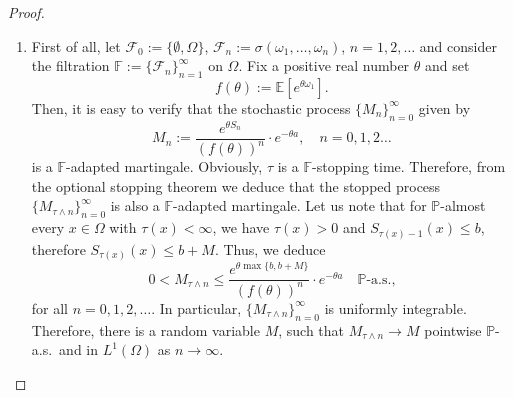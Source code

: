 \documentclass[10pt,a4paper]{amsart}
\newcommand{\cF}{\mathcal{F}}
\begin{document}
\begin{proof}
\begin{enumerate}
    \item First of all, let $\cF_0:=\{\emptyset,\Omega\}$, $\cF_n:=\sigma(\omega_1,\ldots,\omega_n)$, $n=1,2,\ldots$ and consider the filtration $\mathbb{F}:=\{\mathcal{F}_n\}^{\infty}_{n=1}$ on $\Omega$. Fix a positive real number $\theta$ and set
	\begin{equation*}
		f(\theta):=\mathbb{E}[e^{\theta\omega_1}].
	\end{equation*}
	Then, it is easy to verify that the stochastic process $\{M_n\}^{\infty}_{n=0}$ given by
	\begin{equation*}
		M_n:=\frac{e^{\theta S_n}}{(f(\theta))^n}\cdot e^{-\theta a},\quad n=0,1,2\ldots
	\end{equation*}
	is a $\mathbb{F}$-adapted martingale. Obviously, $\tau$ is a $\mathbb{F}$-stopping time. Therefore, from the optional stopping theorem we deduce that the stopped process $\{M_{\tau\wedge n}\}^{\infty}_{n=0}$ is also a $\mathbb{F}$-adapted martingale. Let us note that for $\mathbb{P}$-almost every $x\in\Omega$ with $\tau(x)<\infty$, we have $\tau(x)>0$ and $S_{\tau(x)-1}(x)\leq b$, therefore $S_{\tau(x)}(x)\leq b+M$. Thus, we deduce
	\begin{equation*}
		0<M_{\tau\wedge n}\leq\frac{e^{\theta\max\{b,b+M\}}}{(f(\theta))^n}\cdot e^{-\theta a}\quad\mathbb{P}\text{-a.s.,}
	\end{equation*}
    for all $n=0,1,2,\ldots$. In particular, $\{M_{\tau\wedge n}\}^{\infty}_{n=0}$ is uniformly integrable. Therefore, there is a random variable $M$, such that $M_{\tau\wedge n}\rightarrow M$ pointwise $\mathbb{P}$-a.s.~and in $L^1(\Omega)$ as $n\rightarrow\infty$. 
	

\end{enumerate}
\end{proof}
\end{document}
